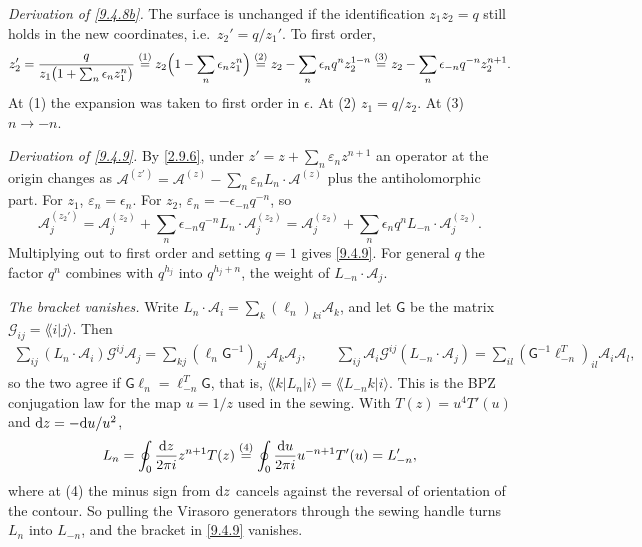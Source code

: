 \begin{tcolorbox}[breakable]
	\begin{remark}
		\emph{Derivation of \eqref{9.4.8b}.} The surface is unchanged if the identification $z_1z_2=q$ still holds in the new coordinates, i.e.\ $z_2'=q/z_1'$. To first order,
		\begin{equation*}
			z_2'=\frac{q}{z_1\bigl(1+\sum_n\epsilon_nz_1^n\bigr)}\overset{(1)}{=}z_2\Bigl(1-\sum_n\epsilon_nz_1^n\Bigr)\overset{(2)}{=}z_2-\sum_n\epsilon_nq^nz_2^{1-n}\overset{(3)}{=}z_2-\sum_n\epsilon_{-n}q^{-n}z_2^{n+1} .
		\end{equation*}
		At (1) the expansion was taken to first order in $\epsilon$. At (2) $z_1=q/z_2$. At (3) $n\to-n$.

		\emph{Derivation of \eqref{9.4.9}.} By \eqref{2.9.6}, under $z'=z+\sum_n\varepsilon_nz^{n+1}$ an operator at the origin changes as $\mathscr A^{(z')}=\mathscr A^{(z)}-\sum_n\varepsilon_nL_n\cdot\mathscr A^{(z)}$ plus the antiholomorphic part. For $z_1$, $\varepsilon_n=\epsilon_n$. For $z_2$, $\varepsilon_n=-\epsilon_{-n}q^{-n}$, so
		\begin{equation*}
			\mathscr A_j^{(z_2')}=\mathscr A_j^{(z_2)}+\sum_n\epsilon_{-n}q^{-n}L_n\cdot\mathscr A_j^{(z_2)}=\mathscr A_j^{(z_2)}+\sum_n\epsilon_nq^{n}L_{-n}\cdot\mathscr A_j^{(z_2)} .
		\end{equation*}
		Multiplying out to first order and setting $q=1$ gives \eqref{9.4.9}. For general $q$ the factor $q^n$ combines with $q^{h_j}$ into $q^{h_j+n}$, the weight of $L_{-n}\cdot\mathscr A_j$.

		\emph{The bracket vanishes.} Write $L_n\cdot\mathscr A_i=\sum_k(\ell_n)_{ki}\mathscr A_k$, and let $\mathsf G$ be the matrix $\mathscr G_{ij}=\lAngle i|j\rangle$. Then
		\begin{align*}
			\sum_{ij}(L_n\cdot\mathscr A_i)\mathscr G^{ij}\mathscr A_j=\sum_{kj}(\ell_n\mathsf G^{-1})_{kj}\mathscr A_k\mathscr A_j,\qquad
			\sum_{ij}\mathscr A_i\mathscr G^{ij}(L_{-n}\cdot\mathscr A_j)=\sum_{il}(\mathsf G^{-1}\ell_{-n}^T)_{il}\mathscr A_i\mathscr A_l ,
		\end{align*}
		so the two agree if $\mathsf G\ell_n=\ell_{-n}^T\mathsf G$, that is, $\lAngle k|L_n|i\rangle=\lAngle L_{-n}k|i\rangle$. This is the BPZ conjugation law for the map $u=1/z$ used in the sewing. With $T(z)=u^4T'(u)$ and $\mathrm{d} z=-\mathrm{d} u/u^2$,
		\begin{equation*}
			L_n=\oint_0\frac{\mathrm{d} z}{2\pi i}z^{n+1}T(z)\overset{(4)}{=}\oint_0\frac{\mathrm{d} u}{2\pi i}u^{-n+1}T'(u)=L'_{-n},
		\end{equation*}
		where at (4) the minus sign from $\mathrm{d} z$ cancels against the reversal of orientation of the contour. So pulling the Virasoro generators through the sewing handle turns $L_n$ into $L_{-n}$, and the bracket in \eqref{9.4.9} vanishes.
	\end{remark}
\end{tcolorbox}

